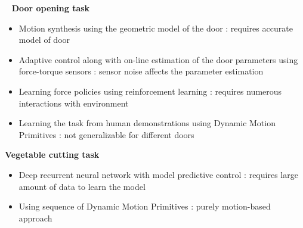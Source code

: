 \documentclass[aspectratio=43,10pt,fleqn,t]{beamer}
\begin{document}
\begin{frame}{~}
	\textbf{Door opening task}
			\begin{itemize}
	\item Motion synthesis using the geometric model of the door : requires accurate model of door
	\item Adaptive control along with on-line estimation of the door parameters using force-torque sensors : sensor noise affects the parameter estimation
	\item Learning force policies using reinforcement learning : requires numerous interactions with environment
	\item Learning the task from human demonstrations using Dynamic Motion Primitives : not generalizable for different doors
\end{itemize}

\textbf{Vegetable cutting task}
\begin{itemize}
	\item Deep recurrent neural network with model predictive control : requires large amount of data to learn the model 
	\item Using sequence of Dynamic Motion Primitives : purely motion-based approach
\end{itemize}
\end{frame}
\end{document}

